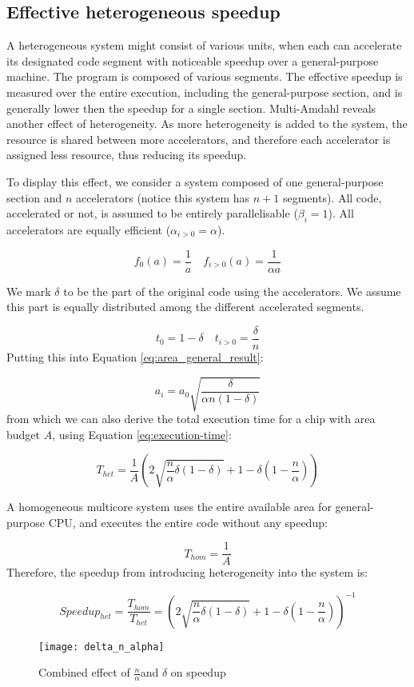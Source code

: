 \documentclass[twocolumn,english]{IEEEtran}
\begin{document}
\subsection{Effective heterogeneous speedup}

A heterogeneous system might consist of various units, when each can
accelerate its designated code segment with noticeable speedup over
a general-purpose machine. The program is composed of various segments.
The effective speedup is measured over the entire execution, including
the general-purpose section, and is generally lower then the speedup
for a single section. Multi-Amdahl reveals another effect of heterogeneity.
As more heterogeneity is added to the system, the resource is shared
between more accelerators, and therefore each accelerator is assigned
less resource, thus reducing its speedup.

To display this effect, we consider a system composed of one general-purpose
section and $n$ accelerators (notice this system has $n+1$ segments).
All code, accelerated or not, is assumed to be entirely parallelisable
($\beta_{i}=1$). All accelerators are equally efficient ($\alpha_{i>0}=\alpha$).

\[
f_{0}(a)=\frac{1}{a}\quad f_{i>0}(a)=\frac{1}{\alpha a}\]


We mark $\delta$ to be the part of the original code using the accelerators.
We assume this part is equally distributed among the different accelerated
segments.

\[
t_{0}=1-\delta\quad t_{i>0}=\frac{\delta}{n}\]
Putting this into Equation \eqref{eq:area_general_result}:

\[
a_{i}=a_{0}\sqrt{\frac{\delta}{\alpha n(1-\delta)}}\]
from which we can also derive the total execution time for a chip
with area budget $A$, using Equation \eqref{eq:execution-time}:

\[
T_{het}=\frac{1}{A}\left(2\sqrt{\frac{n}{\alpha}\delta(1-\delta)}+1-\delta\left(1-\frac{n}{\alpha}\right)\right)\]


A homogeneous multicore system uses the entire available area for
general-purpose CPU, and executes the entire code without any speedup:

\[
T_{hom}=\frac{1}{A}\]
Therefore, the speedup from introducing heterogeneity into the system
is:

\[
Speedup_{het}=\frac{T_{hom}}{T_{het}}=\left(2\sqrt{\frac{n}{\alpha}\delta(1-\delta)}+1-\delta\left(1-\frac{n}{\alpha}\right)\right)^{-1}\]


\begin{figure}[t]
\texttt{[image: delta\_n\_alpha]}

\caption{\label{fig:n_a_de}Combined effect of $\frac{n}{\alpha}$and $\delta$
on speedup}
\end{figure}
\end{document}
